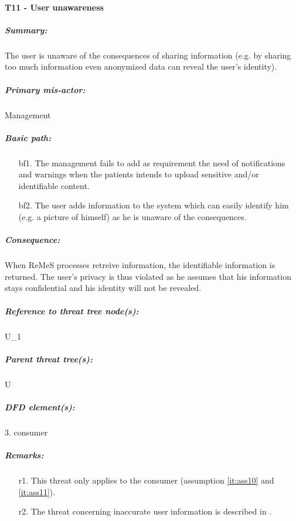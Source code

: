 

\paragraph{T11 - User unawareness}
\label{par:t12}
    \subparagraph{Summary:} The user is unaware of the consequences of sharing information (e.g. by sharing
too much information even anonymized data can reveal the user's identity).
    \subparagraph{Primary mis-actor:} Management
    \subparagraph{Basic path:}
    \begin{enumerate}
        \item[bf1.] The management fails to add as requirement the need of notifications and warnings when the
patients intends to upload sensitive and/or identifiable content.
        \item[bf2.] The user adds information to the system which can easily identify him (e.g. a picture of
himself) as he is unaware of the consequences.
    \end{enumerate}
    \subparagraph{Consequence:} When ReMeS processes retreive information, the identifiable information is
returned. The user's privacy is thus violated as he assumes that his information stays confidential
and his identity will not be revealed.


    \subparagraph{Reference to threat tree node(s):} U\_1
    \subparagraph{Parent threat tree(s):} U
    \subparagraph{DFD element(s):} 3. consumer
    \subparagraph{Remarks:}
    \begin{enumerate}
        \item[r1.] This threat only applies to the consumer (assumption \ref{it:ass10} and \ref{it:ass11}).
        \item[r2.] The threat concerning inaccurate user information is described in .
    \end{enumerate}



